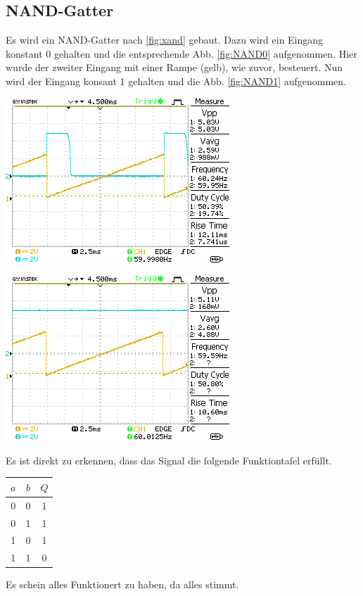 \documentclass[10pt]{article}
\newenvironment{Figure}
  {\par\medskip\noindent\minipage{\linewidth}}
  {\endminipage\par\medskip}
\begin{document}
\begin{multicols}{2}
	\subsection{NAND-Gatter}
	Es wird ein NAND-Gatter nach \ref{fig:xand} gebaut. Dazu wird ein Eingang konstant 0 gehalten und die entsprechende Abb. \ref{fig:NAND0} aufgenommen. Hier wurde der zweiter Eingang mit einer Rampe (gelb), wie zuvor, besteuert. Nun wird der Eingang konsant 1 gehalten und die Abb. \ref{fig:NAND1} aufgenommen.
	\begin{Figure}
		\centering\includegraphics{../data/DS0005.png}
		\label{fig:NAND0}
	\end{Figure}
	\begin{Figure}
		\centering\includegraphics{../data/DS0006.png}
		\label{fig:NAND1}
	\end{Figure}
	Es ist direkt zu erkennen, dass das Signal die folgende Funktiontafel erfüllt.
	\begin{center}
		\begin{tabular}{|c|c|c|}
			\hline
			$a$ & $b$ & $Q$ \\
			\hline
			0   & 0   & 1   \\
			0   & 1   & 1   \\
			1   & 0   & 1   \\
			1   & 1   & 0   \\
			\hline
		\end{tabular}
	\end{center}
  Es schein alles Funktionert zu haben, da alles stimmt.

\end{multicols}
\end{document}
